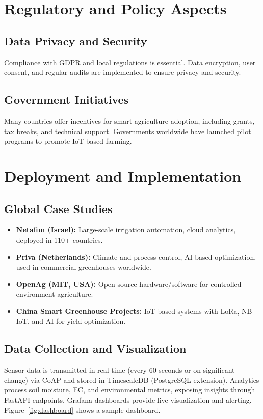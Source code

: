 \documentclass[12pt,a4paper]{article}
\begin{document}
\section{Regulatory and Policy Aspects}
\subsection{Data Privacy and Security}
Compliance with GDPR and local regulations is essential. Data encryption, user consent, and regular audits are implemented to ensure privacy and security.

\subsection{Government Initiatives}
Many countries offer incentives for smart agriculture adoption, including grants, tax breaks, and technical support. Governments worldwide have launched pilot programs to promote IoT-based farming.

\section{Deployment and Implementation}


\subsection{Global Case Studies}
\begin{itemize}
    \item \textbf{Netafim (Israel):} Large-scale irrigation automation, cloud analytics, deployed in 110+ countries.
    \item \textbf{Priva (Netherlands):} Climate and process control, AI-based optimization, used in commercial greenhouses worldwide.
    \item \textbf{OpenAg (MIT, USA):} Open-source hardware/software for controlled-environment agriculture.
    \item \textbf{China Smart Greenhouse Projects:} IoT-based systems with LoRa, NB-IoT, and AI for yield optimization.
\end{itemize}

\subsection{Data Collection and Visualization}
Sensor data is transmitted in real time (every 60 seconds or on significant change) via CoAP and stored in TimescaleDB (PostgreSQL extension). Analytics process soil moisture, EC, and environmental metrics, exposing insights through FastAPI endpoints. Grafana dashboards provide live visualization and alerting. Figure~\ref{fig:dashboard} shows a sample dashboard.
\end{document}
